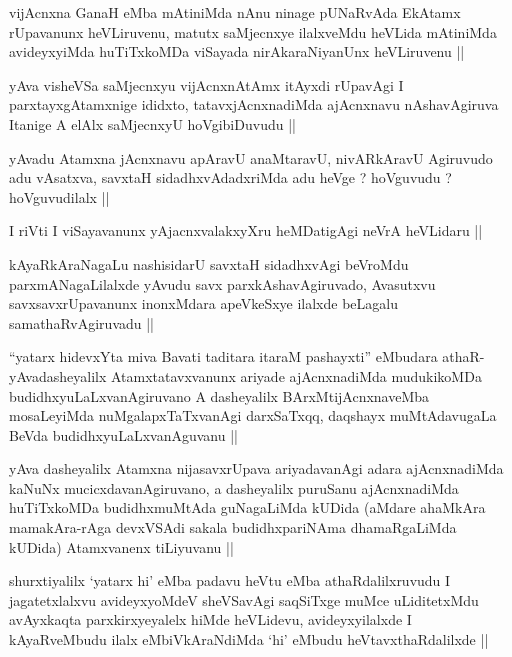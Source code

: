 \begin{artha}
vijAcnxna GanaH eMba mAtiniMda nAnu ninage pUNaRvAda EkAtamx
rUpavanunx heVLiruvenu, matutx saMjecnxye ilalxveMdu heVLida mAtiniMda
avideyxyiMda huTiTxkoMDa viSayada nirAkaraNiyanUnx heVLiruvenu ||
\end{artha}

\begin{artha}
yAva visheVSa saMjecnxyu vijAcnxnAtAmx itAyxdi rUpavAgi I
parxtayxgAtamxnige ididxto, tatavxjAcnxnadiMda ajAcnxnavu
nAshavAgiruva Itanige A elAlx saMjecnxyU hoVgibiDuvudu ||
\end{artha}

\begin{artha}
yAvadu Atamxna jAcnxnavu apAravU anaMtaravU, nivARkAravU Agiruvudo adu
vAsatxva, savxtaH sidadhxvAdadxriMda adu heVge ? hoVguvudu ?
hoVguvudilalx ||
\end{artha}

\begin{artha}
I riVti I viSayavanunx yAjacnxvalakxyXru heMDatigAgi neVrA heVLidaru ||
\end{artha}

\begin{artha}
kAyaRkAraNagaLu nashisidarU savxtaH sidadhxvAgi beVroMdu
parxmANagaLilalxde yAvudu savx parxkAshavAgiruvado, Avasutxvu
savxsavxrUpavanunx inonxMdara apeVkeSxye ilalxde beLagalu
samathaRvAgiruvadu ||
\end{artha}

\begin{artha}
``yatarx hidevxYta miva Bavati taditara itaraM pashayxti'' eMbudara
  athaR- yAvadasheyalilx Atamxtatavxvanunx ariyade ajAcnxnadiMda
  mudukikoMDa budidhxyuLaLxvanAgiruvano A dasheyalilx
  BArxMtijAcnxnaveMba mosaLeyiMda nuMgalapxTaTxvanAgi darxSaTxqq,
  daqshayx muMtAdavugaLa BeVda budidhxyuLaLxvanAguvanu ||
\end{artha}

\begin{artha}
yAva dasheyalilx Atamxna nijasavxrUpava ariyadavanAgi adara
ajAcnxnadiMda kaNuNx mucicxdavanAgiruvano, a dasheyalilx puruSanu
ajAcnxnadiMda huTiTxkoMDa budidhxmuMtAda guNagaLiMda kUDida (aMdare
ahaMkAra mamakAra-rAga devxVSAdi sakala budidhxpariNAma dhamaRgaLiMda
kUDida) Atamxvanenx tiLiyuvanu ||
\end{artha}


\begin{artha}
shurxtiyalilx `yatarx hi' eMba padavu heVtu eMba athaRdalilxruvudu I
jagatetxlalxvu avideyxyoMdeV sheVSavAgi saqSiTxge muMce uLiditetxMdu
avAyxkaqta parxkirxyeyalelx hiMde heVLidevu, avideyxyilalxde I
kAyaRveMbudu ilalx eMbiVkAraNdiMda `hi' eMbudu heVtavxthaRdalilxde ||
\end{artha}

